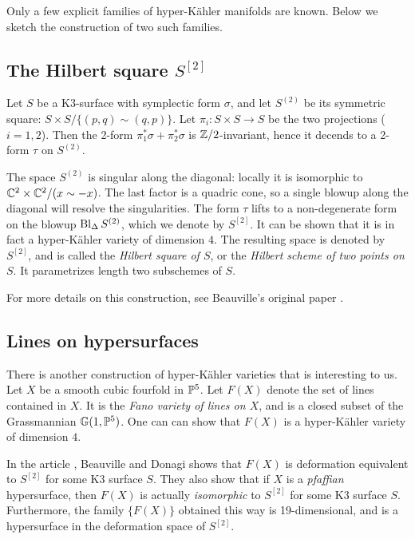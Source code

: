 Only a few explicit families of hyper-Kähler manifolds are known. Below we sketch the construction of two such families.

\subsection{The Hilbert square $S^{[2]}$}

Let $S$ be a K3-surface with symplectic form $\sigma$, and let $S^{(2)}$ be its symmetric square: $S \times S / \{ (p,q) \sim (q,p) \}$. Let $\pi_i:S \times S \to S$ be the two projections ($i=1,2$). Then the 2-form $\pi_1^\ast \sigma + \pi_2^\ast \sigma$ is $\Z/2$-invariant, hence it decends to a 2-form  $\tau$ on $S^{(2)}$.

The space $S^{(2)}$ is singular along the diagonal: locally it is isomorphic to $\C^2 \times \C^2 /(x \sim -x)$. The last factor is a quadric cone, so a single blowup along the diagonal will resolve the singularities. The form $\tau$ lifts to a non-degenerate form on the blowup $\Bl_\Delta S^{(2)}$, which we denote by $S^{[2]}$. It can be shown that it is in fact a hyper-Kähler variety of dimension $4$. The resulting space is denoted by $S^{[2]}$, and is called the \emph{Hilbert square of $S$}, or the \emph{Hilbert scheme of two points on $S$}. It parametrizes length two subschemes of $S$.

For more details on this construction, see Beauville's original paper \cite{beauville_hyperkahler}.

\subsection{Lines on hypersurfaces}

There is another construction of hyper-Kähler varieties that is interesting to us. Let $X$ be a smooth cubic fourfold in $\P^5$. Let $F(X)$ denote the set of lines contained in $X$. It is the \emph{Fano variety of lines on $X$}, and is a closed subset of the Grassmannian $\mathbb G(1,\P^5)$. One can can show that $F(X)$ is a hyper-Kähler variety of dimension $4$.

In the article \cite{beauville_donagi_fano}, Beauville and Donagi shows that $F(X)$ is deformation equivalent to $S^{[2]}$ for some K3 surface $S$. They also show that if $X$ is a \emph{pfaffian} hypersurface, then $F(X)$ is actually \emph{isomorphic} to $S^{[2]}$ for some K3 surface $S$. Furthermore, the family $\{ F(X) \}$  obtained this way is 19-dimensional, and is a hypersurface in the deformation space of $S^{[2]}$.

